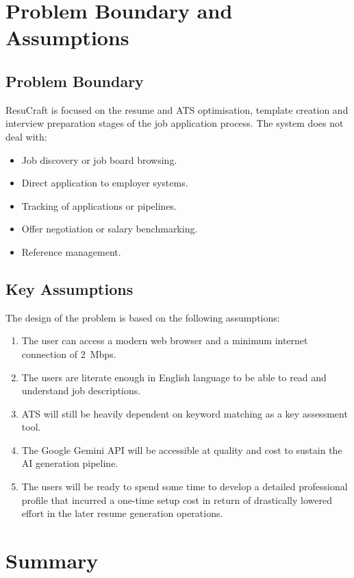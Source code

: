 \documentclass[12pt, a4paper, oneside]{report}
\begin{document}
\section{Problem Boundary and Assumptions}

\subsection{Problem Boundary}

ResuCraft is focused on the resume and ATS optimisation, template creation and interview preparation stages of the job application process. The system does not deal with:

\begin{itemize}
    \item Job discovery or job board browsing.
    \item Direct application to employer systems.
    \item Tracking of applications or pipelines.
    \item Offer negotiation or salary benchmarking.
    \item Reference management.
\end{itemize}

\subsection{Key Assumptions}

The design of the problem is based on the following assumptions:
\begin{enumerate}
    \item The user can access a modern web browser and a minimum internet connection of 2~Mbps.
    \item The users are literate enough in English language to be able to read and understand job descriptions.
    \item ATS will still be heavily dependent on keyword matching as a key assessment tool\cite{jobscan2021}.
    \item The Google Gemini API \cite{gemini2023} will be accessible at quality and cost to sustain the AI generation pipeline.
    \item The users will be ready to spend some time to develop a detailed professional profile that incurred a one-time setup cost in return of drastically lowered effort in the later resume generation operations.
\end{enumerate}

\section{Summary}
\end{document}

